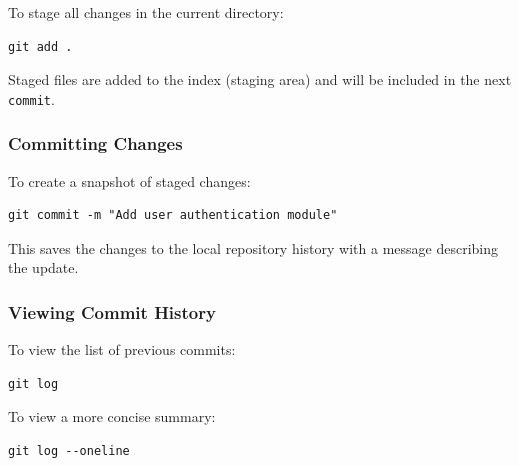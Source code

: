 \documentclass{article}
\newcommand{\codecmd}[1]{\textcolor[rgb]{0,0.5,0}{\texttt{#1}}}
\begin{document}
\noindent To stage all changes in the current directory:

\begin{tcolorbox}[colback=mintgreen, colframe=green!40!black, boxrule=0.5pt, sharp corners]
\begin{verbatim}
git add .
\end{verbatim}
\end{tcolorbox}

\noindent Staged files are added to the index (staging area) and will be included in the next \codecmd{commit}.

\subsubsection{Committing Changes}

To create a snapshot of staged changes:

\begin{tcolorbox}[colback=mintgreen, colframe=green!40!black, boxrule=0.5pt, sharp corners]
\begin{verbatim}
git commit -m "Add user authentication module"
\end{verbatim}
\end{tcolorbox}

\noindent This saves the changes to the local repository history with a message describing the update.

\subsubsection{Viewing Commit History}

To view the list of previous commits:

\begin{tcolorbox}[colback=mintgreen, colframe=green!40!black, boxrule=0.5pt, sharp corners]
\begin{verbatim}
git log
\end{verbatim}
\end{tcolorbox}

\noindent To view a more concise summary:

\begin{tcolorbox}[colback=mintgreen, colframe=green!40!black, boxrule=0.5pt, sharp corners]
\begin{verbatim}
git log --oneline
\end{verbatim}
\end{tcolorbox}
\end{document}
